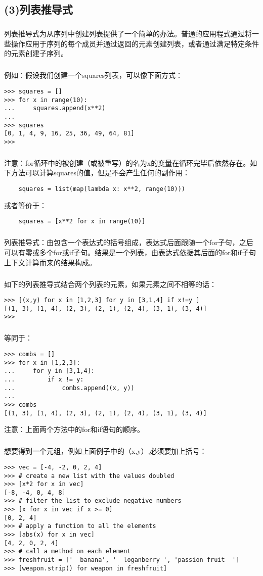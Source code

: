 \documentclass{article}
\begin{document}
\begin{CJK}{UTF8}{gbsn}
\subsection*{(3)列表推导式}
\subparagraph*{}
列表推导式为从序列中创建列表提供了一个简单的办法。普通的应用程式通过将一些操作应用于序列的每个成员并通过返回的元素创建列表，或者通过满足特定条件的元素创建子序列。
\subparagraph*{}
例如：假设我们创建一个squares列表，可以像下面方式：
\begin{verbatim}
>>> squares = []
>>> for x in range(10):
...     squares.append(x**2)
... 
>>> squares
[0, 1, 4, 9, 16, 25, 36, 49, 64, 81]
>>> 
\end{verbatim}
\subparagraph*{}
注意：for循环中的被创建（或被重写）的名为x的变量在循环完毕后依然存在。如下方法可以计算squares的值，但是不会产生任何的副作用：
    \begin{verbatim}
    squares = list(map(lambda x: x**2, range(10)))
    \end{verbatim}
或者等价于：
    \begin{verbatim}
    squares = [x**2 for x in range(10)]
    \end{verbatim}
\subparagraph*{}
列表推导式：由包含一个表达式的括号组成，表达式后面跟随一个for子句，之后可以有零或多个for或if子句。结果是一个列表，由表达式依据其后面的for和if子句上下文计算而来的结果构成。
\subparagraph*{}
如下的列表推导式结合两个列表的元素，如果元素之间不相等的话：
\begin{verbatim}
>>> [(x,y) for x in [1,2,3] for y in [3,1,4] if x!=y ]
[(1, 3), (1, 4), (2, 3), (2, 1), (2, 4), (3, 1), (3, 4)]
>>> 
\end{verbatim}
\subparagraph*{}
等同于：
\begin{verbatim}
>>> combs = []
>>> for x in [1,2,3]:
...     for y in [3,1,4]:
...         if x != y:
...             combs.append((x, y))
...
>>> combs
[(1, 3), (1, 4), (2, 3), (2, 1), (2, 4), (3, 1), (3, 4)]
\end{verbatim}
注意：上面两个方法中的for和if语句的顺序。
\subparagraph*{}
想要得到一个元组，例如上面例子中的（x,y）,必须要加上括号：
\begin{verbatim}
>>> vec = [-4, -2, 0, 2, 4]
>>> # create a new list with the values doubled
>>> [x*2 for x in vec]
[-8, -4, 0, 4, 8]
>>> # filter the list to exclude negative numbers
>>> [x for x in vec if x >= 0]
[0, 2, 4]
>>> # apply a function to all the elements
>>> [abs(x) for x in vec]
[4, 2, 0, 2, 4]
>>> # call a method on each element
>>> freshfruit = ['  banana', '  loganberry ', 'passion fruit  ']
>>> [weapon.strip() for weapon in freshfruit]

\end{verbatim}
\end{CJK}
\end{document}
